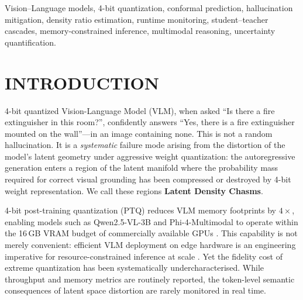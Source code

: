 \documentclass{ieeetmlcn}
\begin{document}
\begin{IEEEkeywords}
Vision--Language models, 4-bit quantization, conformal prediction,
hallucination mitigation, density ratio estimation, runtime monitoring,
student--teacher cascades, memory-constrained inference, multimodal
reasoning, uncertainty quantification.
\end{IEEEkeywords}


\maketitle

\section{INTRODUCTION}
 4-bit quantized Vision-Language Model (VLM), when
asked ``Is there a fire extinguisher in this room?'', confidently answers
``Yes, there is a fire extinguisher mounted on the wall''---in an image
containing none. This is not a random hallucination. It is a
\emph{systematic} failure mode arising from the distortion of the
model's latent geometry under aggressive weight quantization: the
autoregressive generation enters a region of the latent manifold where
the probability mass required for correct visual grounding has been
compressed or destroyed by 4-bit weight representation. We call these
regions \textbf{Latent Density Chasms}.

4-bit post-training quantization (PTQ) reduces VLM memory footprints by
$4\times$, enabling models such as Qwen2.5-VL-3B
\cite{bai2025qwen25vl} and Phi-4-Multimodal \cite{abouelenin2025phi4}
to operate within the 16\,GB VRAM budget of commercially available GPUs
\cite{lin2024awq,dettmers2023qlora}. This capability is not merely
convenient: efficient VLM deployment on edge hardware is an engineering
imperative for resource-constrained inference at scale
\cite{chen2025ktransformers}. Yet the fidelity cost of extreme
quantization has been systematically undercharacterised. While throughput
and memory metrics are routinely reported, the token-level semantic
consequences of latent space distortion are rarely monitored in real
time.
\end{document}
